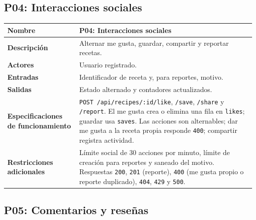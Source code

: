 \documentclass[doc,12pt,a4paper]{apa7}
\begin{document}
\subsection{P04: Interacciones sociales}

\begin{longtable}{|P{3.3cm}|L{11.2cm}|}
\hline
\textbf{Nombre} & P04: Interacciones sociales \\ \hline
\textbf{Descripción} & Alternar me gusta, guardar, compartir y reportar recetas. \\ \hline
\textbf{Actores} & Usuario registrado. \\ \hline
\textbf{Entradas} & Identificador de receta y, para reportes, motivo. \\ \hline
\textbf{Salidas} & Estado alternado y contadores actualizados. \\ \hline
\textbf{Especificaciones de funcionamiento} & \texttt{POST /api/recipes/:id/like}, \texttt{/save}, \texttt{/share} y \texttt{/report}. El me gusta crea o elimina una fila en \texttt{likes}; guardar usa \texttt{saves}. Las acciones son alternables; dar me gusta a la receta propia responde \texttt{400}; compartir registra actividad. \\ \hline
\textbf{Restricciones adicionales} & Límite social de 30 acciones por minuto, límite de creación para reportes y saneado del motivo. Respuestas \texttt{200}, \texttt{201} (reporte), \texttt{400} (me gusta propio o reporte duplicado), \texttt{404}, \texttt{429} y \texttt{500}. \\ \hline
\end{longtable}

\subsection{P05: Comentarios y reseñas}
\end{document}

